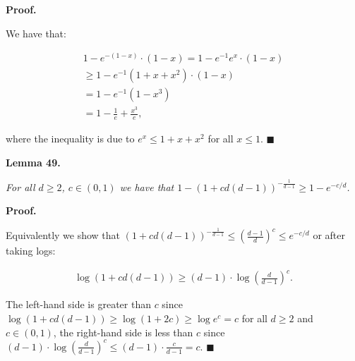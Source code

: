 \documentclass[10pt,a4paper]{article}
\begin{document}



\par\medskip\noindent\textbf{Proof.}\par



We have that:\par


\[\begin{gathered}
\displaystyle 1-e^{-(1-x)}\cdot(1-x) \displaystyle=1-e^{-1}e^{x}\cdot(1-x) \\
\displaystyle\geq 1-e^{-1}(1+x+x^{2})\cdot(1-x) \\
\displaystyle=1-e^{-1}(1-x^{3}) \\
\displaystyle=1-\frac{1}{e}+\frac{x^{3}}{e},
\end{gathered}\]


where the inequality is due to $e^{x}\leq 1+x+x^{2}$ for all $x\leq 1$.
\ensuremath{\blacksquare}\par






\par\medskip\noindent\textbf{\textbf{Lemma 49}\textbf{.}}\par



\emph{For all $d\geq 2$, $c\in(0,1)$ we have that $1-\left(1+cd(d-1)\right)^{-\frac{1}{d-1}}\geq 1-e^{-c/d}$.}\par






\par\medskip\noindent\textbf{Proof.}\par



Equivalently we show that $\left(1+cd(d-1)\right)^{-\frac{1}{d-1}}\leq\left(\frac{d-1}{d}\right)^{c}\leq e^{-c/d}$ or after taking logs:\par


\[\begin{gathered}
\displaystyle\log\left(1+cd(d-1)\right)\geq(d-1)\cdot\log\left(\frac{d}{d-1}\right)^{c}.
\end{gathered}\]


The left-hand side is greater than $c$ since $\log\left(1+cd(d-1)\right)\geq\log\left(1+2c\right)\geq\log{e^{c}}=c$ for all $d\geq 2$ and $c\in(0,1)$, the right-hand side is less than $c$ since $(d-1)\cdot\log\left(\frac{d}{d-1}\right)^{c}\leq(d-1)\cdot\frac{c}{d-1}=c$.
\ensuremath{\blacksquare}\par
\end{document}
